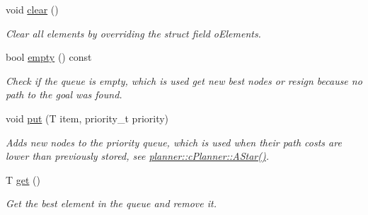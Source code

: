 \begin{DoxyCompactItemize}
\mbox{\label{structplanner_1_1_priority_queue_aa98bde3a7a3256915f80e1e61572214b}} 
void \mbox{\hyperlink{structplanner_1_1_priority_queue_aa98bde3a7a3256915f80e1e61572214b}{clear}} ()
\begin{DoxyCompactList}\small\item\em Clear all elements by overriding the struct field o\+Elements. \end{DoxyCompactList}\item 
\mbox{\label{structplanner_1_1_priority_queue_a459a18939cb4b02517d5a7db19fd829c}} 
bool \mbox{\hyperlink{structplanner_1_1_priority_queue_a459a18939cb4b02517d5a7db19fd829c}{empty}} () const
\begin{DoxyCompactList}\small\item\em Check if the queue is empty, which is used get new best nodes or resign because no path to the goal was found. \end{DoxyCompactList}\item 
\mbox{\label{structplanner_1_1_priority_queue_afb6cb790e6a592d22a2f05441bfbf23b}} 
void \mbox{\hyperlink{structplanner_1_1_priority_queue_afb6cb790e6a592d22a2f05441bfbf23b}{put}} (T item, priority\+\_\+t priority)
\begin{DoxyCompactList}\small\item\em Adds new nodes to the priority queue, which is used when their path costs are lower than previously stored, see \mbox{\hyperlink{classplanner_1_1c_planner_a341e70531266f023ac9461d18979d1ef}{planner\+::c\+Planner\+::\+A\+Star()}}. \end{DoxyCompactList}\item 
\mbox{\label{structplanner_1_1_priority_queue_abdd3d392da157bb645b5720eace1200a}} 
T \mbox{\hyperlink{structplanner_1_1_priority_queue_abdd3d392da157bb645b5720eace1200a}{get}} ()
\begin{DoxyCompactList}\small\item\em Get the best element in the queue and remove it. \end{DoxyCompactList}\item 
\mbox{\label{structplanner_1_1_priority_queue_abba3d8fcc5729acc424b1fbc38c94e84}} 

\end{DoxyCompactItemize}
